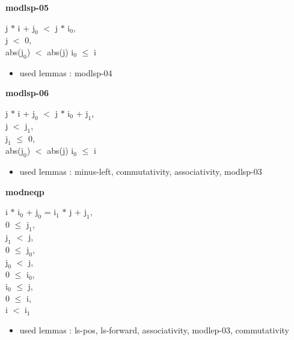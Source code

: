 \documentclass[a4paper]{article}
\begin{document}
\medskip

\bigskip

{\large\bf modlsp-05}

\medskip

j $*$ i + $\mbox{j}_{0}$ $<$ j $*$ $\mbox{i}_{0}$, \\
j $<$ 0, \\
abs($\mbox{j}_{0}$) $<$ abs(j) \Fol $\mbox{i}_{0}$ $\le$ i

\begin{itemize}


\item       used lemmas  : modlsp-04

\end{itemize}

\medskip

\bigskip

{\large\bf modlsp-06}

\medskip

j $*$ i + $\mbox{j}_{0}$ $<$ j $*$ $\mbox{i}_{0}$ + $\mbox{j}_{1}$, \\
j $<$ $\mbox{j}_{1}$, \\
$\mbox{j}_{1}$ $\le$ 0, \\
abs($\mbox{j}_{0}$) $<$ abs(j) \Fol $\mbox{i}_{0}$ $\le$ i

\begin{itemize}


\item       used lemmas  : minus-left, commutativity, associativity, modlsp-03

\end{itemize}

\medskip

\bigskip

{\large\bf modneqp}

\medskip

i $*$ $\mbox{i}_{0}$ + $\mbox{j}_{0}$ = $\mbox{i}_{1}$ $*$ j + $\mbox{j}_{1}$, \\
0 $\le$ $\mbox{j}_{1}$, \\
$\mbox{j}_{1}$ $<$ j, \\
0 $\le$ $\mbox{j}_{0}$, \\
$\mbox{j}_{0}$ $<$ j, \\
0 $\le$ $\mbox{i}_{0}$, \\
$\mbox{i}_{0}$ $\le$ j, \\
0 $\le$ i, \\
i $<$ $\mbox{i}_{1}$ \Fol 

\begin{itemize}


\item       used lemmas  : ls-pos, ls-forward, associativity, modlep-03, commutativity

\end{itemize}
\end{document}
